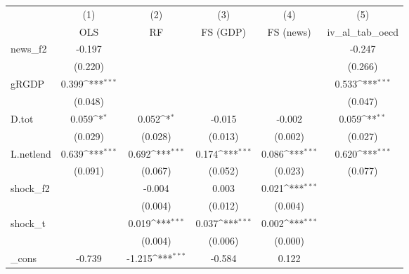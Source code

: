 {
\def\sym#1{\ifmmode^{#1}\else\(^{#1}\)\fi}
\begin{tabular}{l*{5}{c}}
\toprule
            &\multicolumn{1}{c}{(1)}&\multicolumn{1}{c}{(2)}&\multicolumn{1}{c}{(3)}&\multicolumn{1}{c}{(4)}&\multicolumn{1}{c}{(5)}\\
            &\multicolumn{1}{c}{OLS}&\multicolumn{1}{c}{RF}&\multicolumn{1}{c}{FS (GDP)}&\multicolumn{1}{c}{FS (news)}&\multicolumn{1}{c}{iv\_al\_tab\_oecd}\\
\midrule
news\_f2     &      -0.197         &                     &                     &                     &      -0.247         \\
            &     (0.220)         &                     &                     &                     &     (0.266)         \\
\addlinespace
gRGDP       &       0.399\sym{***}&                     &                     &                     &       0.533\sym{***}\\
            &     (0.048)         &                     &                     &                     &     (0.047)         \\
\addlinespace
D.tot       &       0.059\sym{*}  &       0.052\sym{*}  &      -0.015         &      -0.002         &       0.059\sym{**} \\
            &     (0.029)         &     (0.028)         &     (0.013)         &     (0.002)         &     (0.027)         \\
\addlinespace
L.netlend   &       0.639\sym{***}&       0.692\sym{***}&       0.174\sym{***}&       0.086\sym{***}&       0.620\sym{***}\\
            &     (0.091)         &     (0.067)         &     (0.052)         &     (0.023)         &     (0.077)         \\
\addlinespace
shock\_f2    &                     &      -0.004         &       0.003         &       0.021\sym{***}&                     \\
            &                     &     (0.004)         &     (0.012)         &     (0.004)         &                     \\
\addlinespace
shock\_t     &                     &       0.019\sym{***}&       0.037\sym{***}&       0.002\sym{***}&                     \\
            &                     &     (0.004)         &     (0.006)         &     (0.000)         &                     \\
\addlinespace
\_cons      &      -0.739         &      -1.215\sym{***}&      -0.584         &       0.122         &                     \\

\end{tabular}}
